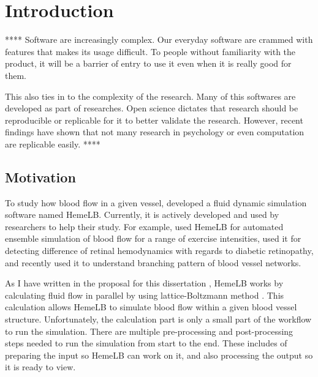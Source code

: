  

\chapter[Introduction]{Introduction}

****
Software are increasingly complex. Our everyday software are crammed with features that makes its usage difficult. To people without familiarity with the product, it will be a barrier of entry to use it even when it is really good for them.

This also ties in to the complexity of the research. Many of this softwares are developed as part of researches. Open science dictates that research should be reproducible or replicable for it to better validate the research. However, recent findings have shown that not many research in psychology or even computation are replicable easily.  
****


\section{Motivation}
To study how blood flow in a given vessel, \cite{mazzeo2008hemelb} developed a fluid dynamic simulation software named HemeLB. Currently, it is actively developed and used by researchers to help their study. For example, \cite{itani2015automated} used HemeLB for automated ensemble simulation of blood flow for a range of exercise intensities,  \cite{bernabeu2015characterization} used it for detecting difference of retinal hemodynamics with regards to diabetic retinopathy, and recently \cite{franco2015dynamic,franco2016non} used it to understand branching pattern of blood vessel networks.

As I have written in the proposal for this dissertation \citep{Steven:2016aa}, HemeLB works by calculating fluid flow in parallel by using lattice-Boltzmann method \citep{mazzeo2008hemelb}. This calculation allows HemeLB to simulate blood flow within a given blood vessel structure. Unfortunately, the calculation part is only a small part of the workflow to run the simulation. There are multiple pre-processing and post-processing steps needed to run the simulation from start to the end. These includes of preparing the input so HemeLB can work on it, and also processing the output so it is ready to view.

